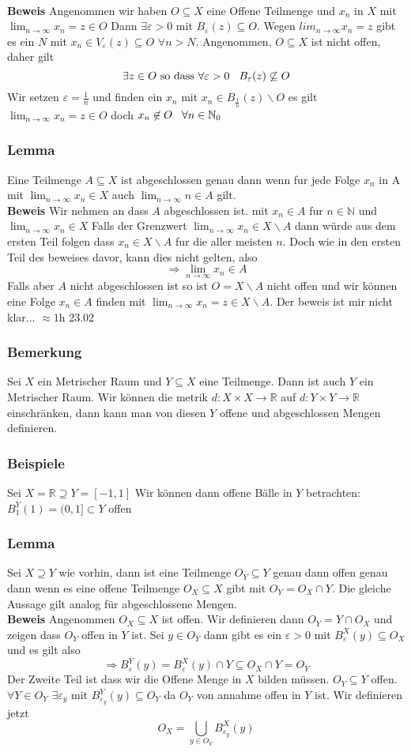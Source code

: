 \documentclass{article}
\newcommand{\smspc}{\hspace{0.3cm}}
\newcommand{\beweis}{\\\textbf{Beweis }}
\newcommand{\beispiel}[1]{\subsubsection*{Beispiele {#1}}}
\newcommand{\bemerkung}[1]{\subsubsection*{Bemerkung {#1}}}
\newcommand{\lemma}[1]{\subsubsection*{Lemma {#1}}}
\begin{document}
\beweis Angenommen wir haben $O\subseteq X$ eine Offene Teilmenge und $x_n$ in $X$ mit $\lim_{n\rightarrow \infty}x_n=z\in O$ Dann $\exists \varepsilon >0$ mit $B_\varepsilon (z)\subseteq O$. Wegen $lim_{n\rightarrow \infty}x_n=z$ gibt es ein $N$ mit $x_n\in V_\varepsilon(z)\subseteq O$ $\forall n>N$.\newline
Angenommen, $O\subseteq X$ ist nicht offen, daher gilt\[\exists z\in O\text{ so dass } \forall \varepsilon>0\smspc B_\varepsilon (z)\not\subseteq O\] Wir setzen $\varepsilon=\frac{1}{n}$ und finden ein $x_n$ mit $x_n\in B_{\frac{1}{n}}(z)\backslash O$ es gilt $\lim_{n\rightarrow \infty} x_n=z\in O$ doch $x_n\not\in O\smspc \forall n\in \mathbb{N}_0$
\lemma{} Eine Teilmenge $A\subseteq X$ ist abgeschlossen genau dann wenn fur jede Folge $x_n$ in A mit $\lim_{n\rightarrow\infty}x_n\in X$ auch $\lim_{n\rightarrow \infty}n\in A$ gilt.
\beweis Wir nehmen an dass $A$ abgeschlossen ist. mit $x_n\in A$ fur $n\in \mathbb{N}$ und $\lim_{n\rightarrow\infty}x_n\in X$ Falls der Grenzwert $\lim_{n\rightarrow\infty}x_n\in X\backslash A$ dann würde aus dem ersten Teil folgen dass $x_n\in X\backslash A$ fur die aller meisten $n$. Doch wie in den ersten Teil des beweises davor, kann dies nicht gelten, also \[\Longrightarrow \lim_{n\rightarrow\infty}x_n\in A\]
\newline Falls aber $A$ nicht abgeschlossen ist so ist $O=X\backslash A$ nicht offen und wir können eine Folge $x_n\in A$ finden mit $\lim_{n\rightarrow\infty}x_n=z\in X\backslash A$. Der beweis ist mir nicht klar... $\approx 1$h 23.02
\bemerkung{} Sei $X$ ein Metrischer Raum und $Y\subseteq X$ eine Teilmenge. Dann ist auch $Y$ ein Metrischer Raum. Wir können die metrik $d:X\times X\rightarrow \mathbb{R}$ auf $d:Y\times Y\rightarrow \mathbb{R}$ einschränken, dann kann man von diesen $Y$ offene und abgeschlossen Mengen definieren.
\beispiel{} Sei $X=\mathbb{R}\supseteq Y=[-1,1]$ Wir können dann offene Bälle in $Y$ betrachten: $B^Y_1(1)=(0,1]\subset Y$ offen
\lemma{} Sei $X\supseteq Y$ wie vorhin, dann ist eine Teilmenge $O_Y\subseteq Y$ genau dann offen genau dann wenn es eine offene Teilmenge $O_X\subseteq X$ gibt mit $O_Y=O_X\cap Y$. Die gleiche Aussage gilt analog für abgeschlossene Mengen.
\beweis Angenommen $O_X\subseteq X$ ist offen. Wir definieren dann $O_Y=Y\cap O_X$ und zeigen dass $O_Y$ offen in $Y$ ist. Sei $y\in O_Y$ dann gibt es ein $\varepsilon >0$ mit $B_\varepsilon^X(y)\subseteq O_X$ und es gilt also
\[\Longrightarrow B_\varepsilon^Y(y)=B_\varepsilon^X(y)\cap Y\subseteq O_X\cap Y=O_Y\]
Der Zweite Teil ist dass wir die Offene Menge in $X$ bilden müssen. $O_Y\subseteq Y$ offen. $\forall Y\in O_Y$ $\exists \varepsilon_y$ mit $B_{\varepsilon_y}^Y(y)\subseteq O_Y$ da $O_Y$ von annahme offen in $Y$ ist. Wir definieren jetzt \[O_X=\bigcup_{y\in O_Y}B_{\varepsilon_y}^X(y)\]
\end{document}
